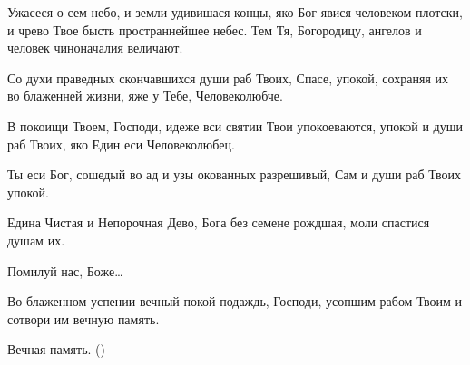 \begin{mymulticols}
 Ужасеся о сем небо, и земли удивишася концы, яко Бог явися человеком плотски, и чрево Твое бысть пространнейшее небес. Тем Тя, Богородицу, ангелов и человек чиноначалия величают. 

\TrisviatoePoOtcheNash

 Со духи праведных скончавшихся души раб Твоих, Спасе, упокой, сохраняя их во блаженней жизни, яже у Тебе, Человеколюбче. 

В покоищи Твоем, Господи, идеже вси святии Твои упокоеваются, упокой и души раб Твоих, яко Един еси Человеколюбец. 

\slavan

Ты еси Бог, сошедый во ад и узы окованных разрешивый, Сам и души раб Твоих упокой. 

\inynen

 Едина Чистая и Непорочная Дево, Бога без семене рождшая, моли спастися душам их. 

 Помилуй нас, Боже… 


Во блаженном успении вечный покой подаждь, Господи, усопшим рабом Твоим  и сотвори им вечную память. 

 Вечная память. ()

\end{mymulticols}

\mychapterending


